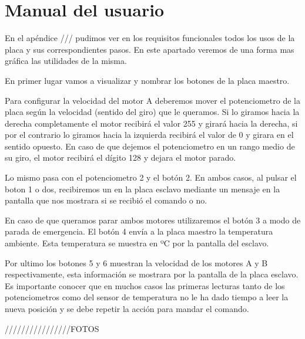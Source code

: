 \section{Manual del usuario}
En el apéndice /// pudimos ver en los requisitos funcionales todos los usos de la placa y sus correspondientes pasos. En este apartado veremos de una forma mas gráfica las utilidades de la misma.

En primer lugar vamos a visualizar y nombrar los botones de la placa maestro.


\begin{description}
\item Para configurar la velocidad del motor A deberemos mover el potenciometro de la placa según la velocidad (sentido del giro) que le queramos. Si lo giramos hacia la derecha completamente el motor recibirá el valor 255 y girará hacia la derecha, si por el contrario lo giramos hacia la izquierda recibirá el valor de 0 y girara en el sentido opuesto. En caso de que dejemos el potenciometro en un rango medio de su giro, el motor recibirá el dígito 128 y dejara el motor parado. 
\item Lo mismo pasa con el potenciometro 2 y el botón 2. En ambos casos, al pulsar el boton 1 o dos, recibiremos un  en la placa esclavo mediante un mensaje en la pantalla que nos mostrara si se recibió el comando o no.
\item En caso de que queramos parar ambos motores utilizaremos el botón 3 a modo de parada de emergencia. 
El botón 4 envía a la placa maestro la temperatura ambiente. Esta temperatura se muestra en ºC por la pantalla del esclavo. 
\item Por ultimo los botones 5 y 6 muestran la velocidad de los motores A y B respectivamente, esta información se mostrara por la pantalla de la placa esclavo.
Es importante conocer que en muchos casos las primeras lecturas tanto de los potenciometros como del sensor de temperatura no le ha dado tiempo a leer la nueva posición y se debe repetir la acción para mandar el comando.
\end{description}

////////////////FOTOS


